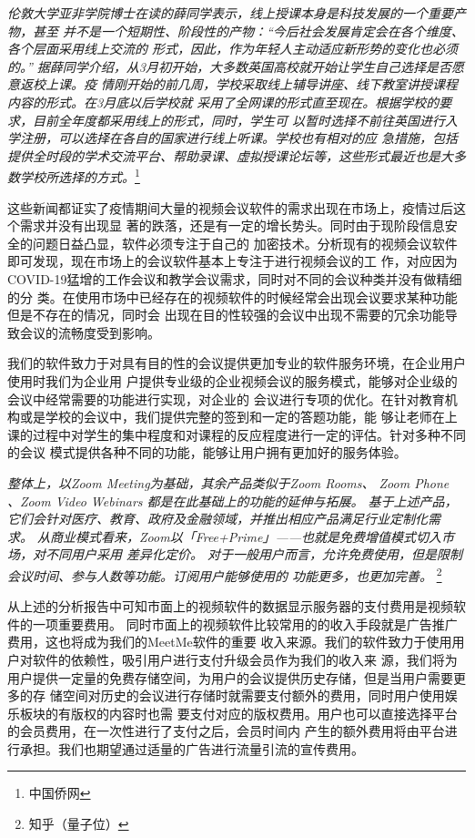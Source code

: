 \documentclass[a4paper,12pt]{article}
\begin{document}
    \textit{伦敦大学亚非学院博士在读的薛同学表示，线上授课本身是科技发展的一个重要产物，甚至
    并不是一个短期性、阶段性的产物：“今后社会发展肯定会在各个维度、各个层面采用线上交流的
    形式，因此，作为年轻人主动适应新形势的变化也必须的。”
    据薛同学介绍，从3月初开始，大多数英国高校就开始让学生自己选择是否愿意返校上课。疫
    情刚开始的前几周，学校采取线上辅导讲座、线下教室讲授课程内容的形式。在3月底以后学校就
    采用了全网课的形式直至现在。根据学校的要求，目前全年度都采用线上的形式，同时，学生可
    以暂时选择不前往英国进行入学注册，可以选择在各自的国家进行线上听课。学校也有相对的应
    急措施，包括提供全时段的学术交流平台、帮助录课、虚拟授课论坛等，这些形式最近也是大多
    数学校所选择的方式。}\footnote{中国侨网}

    这些新闻都证实了疫情期间大量的视频会议软件的需求出现在市场上，疫情过后这个需求并没有出现显
    著的跌落，还是有一定的增长势头。同时由于现阶段信息安全的问题日益凸显，软件必须专注于自己的
    加密技术。分析现有的视频会议软件即可发现，现在市场上的会议软件基本上专注于进行视频会议的工
    作，对应因为COVID-19猛增的工作会议和教学会议需求，同时对不同的会议种类并没有做精细的分
    类。在使用市场中已经存在的视频软件的时候经常会出现会议要求某种功能但是不存在的情况，同时会
    出现在目的性较强的会议中出现不需要的冗余功能导致会议的流畅度受到影响。

    我们的软件致力于对具有目的性的会议提供更加专业的软件服务环境，在企业用户使用时我们为企业用
    户提供专业级的企业视频会议的服务模式，能够对企业级的会议中经常需要的功能进行实现，对企业的
    会议进行专项的优化。在针对教育机构或是学校的会议中，我们提供完整的签到和一定的答题功能，能
    够让老师在上课的过程中对学生的集中程度和对课程的反应程度进行一定的评估。针对多种不同的会议
    模式提供各种不同的功能，能够让用户拥有更加好的服务体验。

    \textit{整体上，以Zoom Meeting为基础，其余产品类似于Zoom Rooms、 Zoom Phone 、Zoom
    Video Webinars 都是在此基础上的功能的延伸与拓展。
    基于上述产品，它们会针对医疗、教育、政府及金融领域，并推出相应产品满足行业定制化需
    求。
    从商业模式看来，Zoom以「Free+Prime」——也就是免费增值模式切入市场，对不同用户采用
    差异化定价。
    对于一般用户而言，允许免费使用，但是限制会议时间、参与人数等功能。订阅用户能够使用的
    功能更多，也更加完善。}
    \footnote{知乎（量子位）}

    从上述的分析报告中可知市面上的视频软件的数据显示服务器的支付费用是视频软件的一项重要费用。
    同时市面上的视频软件比较常用的的收入手段就是广告推广费用，这也将成为我们的MeetMe软件的重要
    收入来源。我们的软件致力于使用用户对软件的依赖性，吸引用户进行支付升级会员作为我们的收入来
    源，我们将为用户提供一定量的免费存储空间，为用户的会议提供历史存储，但是当用户需要更多的存
    储空间对历史的会议进行存储时就需要支付额外的费用，同时用户使用娱乐板块的有版权的内容时也需
    要支付对应的版权费用。用户也可以直接选择平台的会员费用，在一次性进行了支付之后，会员时间内
    产生的额外费用将由平台进行承担。我们也期望通过适量的广告进行流量引流的宣传费用。
\end{document}
